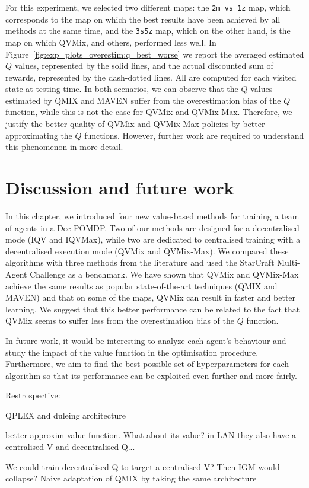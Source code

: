 For this experiment, we selected two different maps: the \texttt{2m\_vs\_1z} map, which corresponds to the map on which the best results have been achieved by all methods at the same time, and the \texttt{3s5z} map, which on the other hand, is the map on which QVMix, and others, performed less well.
In Figure~\ref{fig:exp_plots_overestim:q_best_worse} we report the averaged estimated $Q$ values, represented by the solid lines, and the actual discounted sum of rewards, represented by the dash-dotted lines.
All are computed for each visited state at testing time.
In both scenarios, we can observe that the $Q$ values estimated by QMIX and MAVEN suffer from the overestimation bias of the $Q$ function, while this is not the case for QVMix and QVMix-Max.
Therefore, we justify the better quality of QVMix and QVMix-Max policies by better approximating the $Q$ functions.
However, further work are required to understand this phenomenon in more detail.

\section{Discussion and future work} \label{sec:ch4_conclusion}

In this chapter, we introduced four new value-based methods for training a team of agents in a Dec-POMDP.
Two of our methods are designed for a decentralised mode (IQV and IQVMax), while two are dedicated to centralised training with a decentralised execution mode (QVMix and QVMix-Max).
We compared these algorithms with three methods from the literature and used the StarCraft Multi-Agent Challenge as a benchmark. 
We have shown that QVMix and QVMix-Max achieve the same results as popular state-of-the-art techniques (QMIX and MAVEN) and that on some of the maps, QVMix can result in faster and better learning.
We suggest that this better performance can be related to the fact that QVMix seems to suffer less from the overestimation bias of the $Q$ function.

In future work, it would be interesting to analyze each agent's behaviour and study the impact of the value function in the optimisation procedure.
Furthermore, we aim to find the best possible set of hyperparameters for each algorithm so that its performance can be exploited even further and more fairly.

Restrospective:

QPLEX and duleing architecture

better approxim value function. What about its value? in LAN they also have a centralised V and decentralised Q...

We could train decentralised Q to target a centralised V? Then IGM would collapse?
Naive adaptation of QMIX by taking the same architecture


